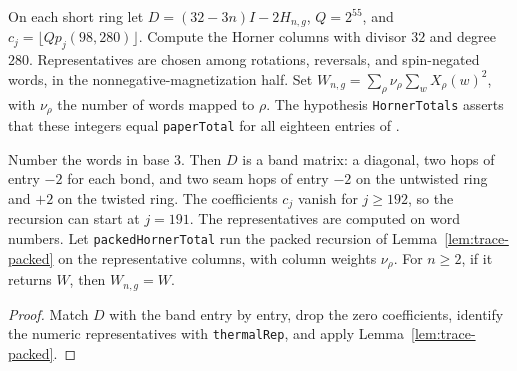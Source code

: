 \begin{definition}
  \label{def:spin1-horner36}
  \leanok
  On each short ring let \(D=(32-3n)I-2H_{n,g}\), \(Q=2^{55}\), and
  \(c_j=\lfloor Qp_j(98,280)\rfloor\).
  Compute the Horner columns with divisor \(32\) and degree \(280\).
  Representatives are chosen among rotations, reversals, and spin-negated words, in the
  nonnegative-magnetization half.
  Set \(W_{n,g}=\sum_\rho\nu_\rho\sum_w X_\rho(w)^2\), with \(\nu_\rho\) the number of words
  mapped to \(\rho\).
  The hypothesis \texttt{HornerTotals} asserts that these integers equal \texttt{paperTotal}
  for all eighteen entries of \cite[Appendix B.4]{OpenAIHaldane}.
\end{definition}

\begin{lemma}
  \label{lem:spin1-horner36-packed}
  \leanok
  Number the words in base \(3\). Then \(D\) is a band matrix: a diagonal, two hops of
  entry \(-2\) for each bond, and two seam hops of entry \(-2\) on the untwisted ring and
  \(+2\) on the twisted ring. The coefficients \(c_j\) vanish for \(j \ge 192\), so the
  recursion can start at \(j = 191\). The representatives are computed on word numbers.
  Let \texttt{packedHornerTotal} run the packed recursion of Lemma~\ref{lem:trace-packed} on
  the representative columns, with column weights \(\nu_\rho\). For \(n \ge 2\), if it
  returns \(W\), then \(W_{n,g} = W\).
\end{lemma}
\begin{proof}
  \leanok
  Match \(D\) with the band entry by entry, drop the zero coefficients, identify the
  numeric representatives with \texttt{thermalRep}, and apply Lemma~\ref{lem:trace-packed}.
\end{proof}

